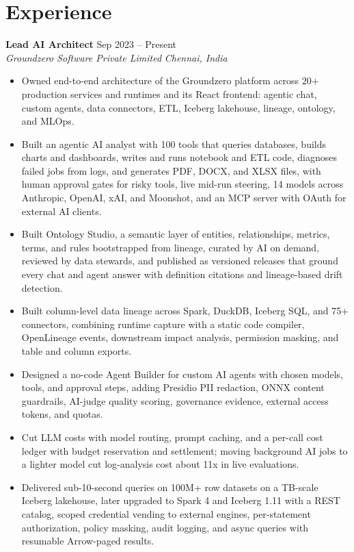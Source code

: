 \documentclass[10pt,letterpaper]{article}
\newcommand{\resumeRole}[4]{
  \textbf{#1} \hfill #2 \\
  \textit{#3} \hfill \textit{#4}
}
\begin{document}
\section*{Experience}
\resumeRole{Lead AI Architect}{Sep 2023 -- Present}{Groundzero Software Private Limited}{Chennai, India}
\begin{itemize}
  \item Owned end-to-end architecture of the Groundzero platform across 20+ production services and runtimes and its React frontend: agentic chat, custom agents, data connectors, ETL, Iceberg lakehouse, lineage, ontology, and MLOps.
  \item Built an agentic AI analyst with 100 tools that queries databases, builds charts and dashboards, writes and runs notebook and ETL code, diagnoses failed jobs from logs, and generates PDF, DOCX, and XLSX files, with human approval gates for risky tools, live mid-run steering, 14 models across Anthropic, OpenAI, xAI, and Moonshot, and an MCP server with OAuth for external AI clients.
  \item Built Ontology Studio, a semantic layer of entities, relationships, metrics, terms, and rules bootstrapped from lineage, curated by AI on demand, reviewed by data stewards, and published as versioned releases that ground every chat and agent answer with definition citations and lineage-based drift detection.
  \item Built column-level data lineage across Spark, DuckDB, Iceberg SQL, and 75+ connectors, combining runtime capture with a static code compiler, OpenLineage events, downstream impact analysis, permission masking, and table and column exports.
  \item Designed a no-code Agent Builder for custom AI agents with chosen models, tools, and approval steps, adding Presidio PII redaction, ONNX content guardrails, AI-judge quality scoring, governance evidence, external access tokens, and quotas.
  \item Cut LLM costs with model routing, prompt caching, and a per-call cost ledger with budget reservation and settlement; moving background AI jobs to a lighter model cut log-analysis cost about 11x in live evaluations.
  \item Delivered sub-10-second queries on 100M+ row datasets on a TB-scale Iceberg lakehouse, later upgraded to Spark 4 and Iceberg 1.11 with a REST catalog, scoped credential vending to external engines, per-statement authorization, policy masking, audit logging, and async queries with resumable Arrow-paged results.

\end{itemize}
\end{document}
